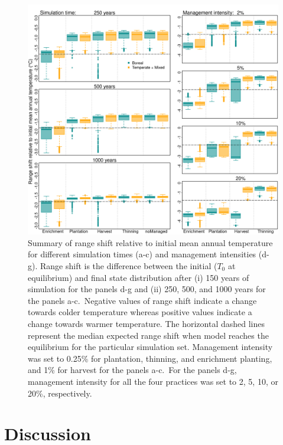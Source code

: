 \hypertarget{fig:sim-result3}{%
\begin{figure}
\centering
\includegraphics{manuscript/img/sim-result_4.png}
\caption[{Summary of range shift relative to initial mean annual
temperature for different simulation times (a-c) and management
intensities (d-g).}]{Summary of range shift relative to initial mean
annual temperature for different simulation times (a-c) and management
intensities (d-g). Range shift is the difference between the initial
(\(T_0\) at equilibrium) and final state distribution after (i) 150
years of simulation for the panels d-g and (ii) 250, 500, and 1000 years
for the panels a-c.~Negative values of range shift indicate a change
towards colder temperature whereas positive values indicate a change
towards warmer temperature. The horizontal dashed lines represent the
median expected range shift when model reaches the equilibrium for the
particular simulation set. Management intensity was set to 0.25\% for
plantation, thinning, and enrichment planting, and 1\% for harvest for
the panels a-c.~For the panels d-g, management intensity for all the
four practices was set to 2, 5, 10, or 20\%, respectively.}
\label{fig:sim-result3}
\end{figure}
}

\hypertarget{discussion}{%
\section{Discussion}\label{discussion}}

